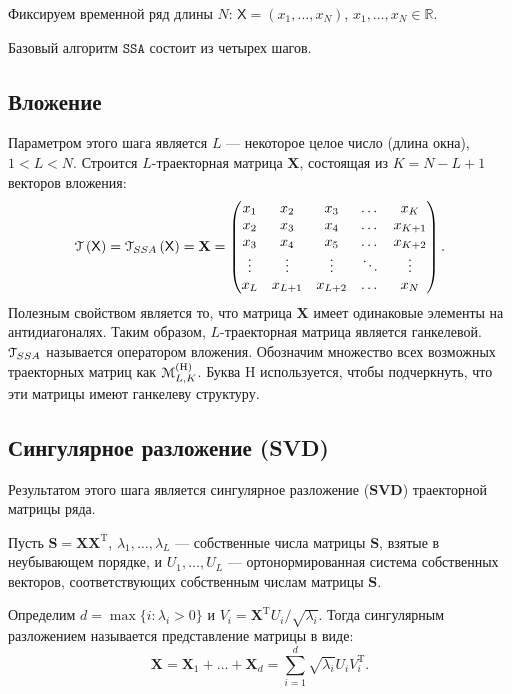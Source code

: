 \documentclass[12pt, specialist, subf
]{disser}
\theoremstyle{definition}
\newcommand{\SSA}{\texttt{SSA}}
\newcommand{\TS}{\mathsf{X}}
\newcommand{\MH}{\EuScript{M}_{L,K}^{(\mathrm{H})}}
\begin{document}
Фиксируем временной ряд длины $N$: $\TS = (x_1, \dots, x_{N})$, $x_1, \dots, x_{N} \in \mathbb{R}$.

Базовый алгоритм $\SSA$ состоит из четырех шагов.

\subsection*{Вложение}
Параметром этого шага является $L$ --- некоторое целое число (длина окна), $1 < L < N$. Строится $L$-траекторная матрица $\mathbf{X}$, состоящая из $K = N - L + 1$ векторов вложения:
\begin{equation}
	\label{eq:X}
	\EuScript{T} \left(\TS \right) = \EuScript{T}_{SSA} \left(\TS \right)=
	\mathbf{X} =
	\begin{pmatrix}
		x_1    & x_2     & x_3     & \dots  & x_{K}   \\
		x_2    & x_3     & x_4     & \dots  & x_{K+1} \\
		x_3    & x_4     & x_5     & \dots  & x_{K+2} \\
		\vdots & \vdots  & \vdots  & \ddots & \vdots  \\
		x_{L}  & x_{L+1} & x_{L+2} & \dots  & x_{N}
	\end{pmatrix}.
\end{equation}
Полезным свойством является то, что матрица $\mathbf{X}$ имеет одинаковые элементы на антидиагоналях. Таким образом, $L$-траекторная матрица является ганкелевой. $\EuScript{T}_{SSA}$ называется оператором вложения. Обозначим множество всех возможных траекторных матриц как \( \MH \). Буква \( \mathrm{H} \) используется, чтобы подчеркнуть, что эти матрицы имеют ганкелеву структуру.

\subsection*{Сингулярное разложение (SVD)}
Результатом этого шага является сингулярное разложение ($\mathbf{SVD}$) траекторной матрицы ряда.

Пусть $\mathbf{S} = \mathbf{X}\mathbf{X}^{\mathrm{T}}$,
$\lambda_1, \dots, \lambda_L$ --- собственные числа матрицы $\mathbf{S}$, взятые в неубывающем порядке, и
$U_1, \dots, U_L$ --- ортонормированная система собственных векторов, соответствующих собственным числам матрицы $\mathbf S$.

Определим $d = \max{ \{i: \lambda_i > 0 \}}$ и
$V_i = \mathbf{X}^{\mathrm{T}} U_i / \sqrt{\lambda_i}$.
Тогда сингулярным разложением называется представление матрицы в виде:
\begin{equation}
	\mathbf{X} = \mathbf{X}_1 + \dots + \mathbf{X}_d =
	\sum_{i = 1}^{d} \sqrt{\lambda_i} U_i V_{i}^{\mathrm{T}}\label{eq:1}.
\end{equation}
\end{document}
